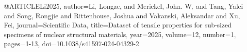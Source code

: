 @ARTICLE{Li2025,
  author={Li, Longze, and Merickel, John. W, and Tang, Yalei and Song, Rongjie and Rittenhouse, Joshua and Vakanski, Aleksandar and Xu, Fei},
  journal={Scientific Data}, 
  title={Dataset of tensile properties for sub-sized specimens of nuclear structural materials}, 
  year={2025},
  volume={12},
  number={1},
  pages={1-13},
  doi={10.1038/s41597-024-04329-2}}
